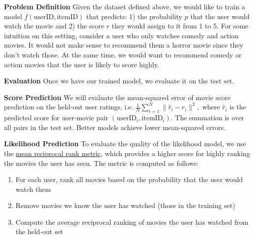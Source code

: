 \textbf{Problem Definition}
Given the dataset defined above, we would like to train a model $f(\text{userID}, \text{itemID})$ that predicts: 1) the probability $p$ that the user would watch the movie and 2) the score $r$ they would assign to it from 1 to 5. For some intuition on this setting, consider a user who only watches comedy and action movies. It would not make sense to recommend them a horror movie since they don't watch those. At the same time, we would want to recommend comedy or action movies that the user is likely to score highly. 

\textbf{Evaluation}
Once we have our trained model, we evaluate it on the test set.

\vspace{0.2cm}
\textbf{Score Prediction} We will evaluate the mean-squared error of movie score prediction on the held-out user ratings, i.e.
    $
        \frac{1}{N}\sum_{i=1}^N \|\hat{r}_i-r_i\|^2,
    $
    where $\hat{r}_i$ is the predicted score for user-movie pair $(\text{userID}_i,\text{itemID}_i)$. The summation is over all pairs in the test set. Better models achieve lower mean-squared errors.
    
\vspace{0.2cm}
\noindent \textbf{Likelihood Prediction}  
To evaluate the quality of the likelihood model, we use the \href{https://en.wikipedia.org/wiki/Mean_reciprocal_rank} {mean reciprocal rank metric}, which provides a higher score for highly ranking the movies the user has seen. The metric is computed as follows: 
\begin{enumerate}
    \item For each user, rank all movies based on the probability that the user would watch them
    \item Remove movies we know the user has watched (those in the training set)
    \item Compute the average reciprocal ranking of movies the user has watched from the held-out set
\end{enumerate} 

